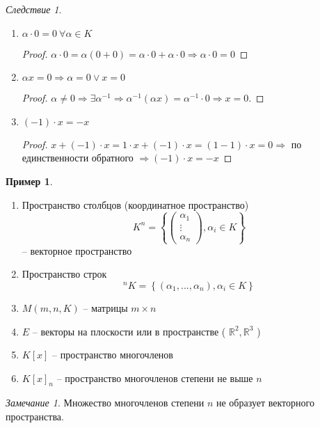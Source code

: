 \documentclass[12pt]{article}
\newenvironment{MyList}[1][4pt]{
  \begin{enumerate}[1.]
  \setlength{\parskip}{0pt}
  \setlength{\itemsep}{#1}
}{       
  \end{enumerate}
}
\def\R{\mathbb{R}}       %
\def\SO{\Rightarrow}     %
\theoremstyle{definition} %
\newtheorem{Example}[Thm]{Пример} %
\theoremstyle{plain} %
\theoremstyle{remark} %
\newtheorem{Cons}[Thm]{Следствие} %
\newtheorem{Rem}[Thm]{Замечание} %
\begin{document}
{\begin{Cons}
\begin{MyList}
        \item $\alpha \cdot 0 = 0 \ \forall \alpha \in K$
        \begin{proof}
            $\alpha \cdot 0 = \alpha (0 + 0) = \alpha \cdot 0 + \alpha \cdot 0 \SO \alpha \cdot 0 = 0$ 
        \end{proof}

        \item $\alpha x = 0 \SO \alpha = 0 \vee x = 0$
        \begin{proof}
            $\alpha \neq 0 \SO \exists \alpha^{-1} \SO \alpha^{-1} (\alpha x) = \alpha^{-1} \cdot 0 \SO x = 0$. 
        \end{proof}

        \item $(-1) \cdot x = -x$ 
        \begin{proof}
            $x + (-1) \cdot x = 1 \cdot x + (-1) \cdot x = (1 - 1) \cdot x = 0 \SO$ по единственности обратного $\SO (-1) \cdot x = -x$ 
        \end{proof}
    \end{MyList}
\end{Cons}

\begin{Example}
    \begin{MyList}
        \item Пространство столбцов (координатное пространство)
        \[K^n = \left\{\begin{pmatrix}
        \alpha_1 \\ 
        \vdots \\ 
        \alpha_n
        \end{pmatrix}, \alpha_i \in K\right\}\]
        -- векторное пространство

        \item Пространство строк
        \[^n K = \left\{(\alpha_1, ..., \alpha_n), \alpha_i \in K\right\}\]

        \item $M(m, n, K)$ -- матрицы $m \times n$ 
        \item $E$ -- векторы на плоскости или в пространстве ( $\R^2, \R^3$ ) 
        \item $K[x]$ -- пространство многочленов
        \item $K[x]_n$ -- пространство многочленов степени не выше $n$
    \end{MyList}
\end{Example}

\begin{Rem}
    Множество многочленов степени $n$ не образует векторного пространства.
\end{Rem}

}
\end{document}
